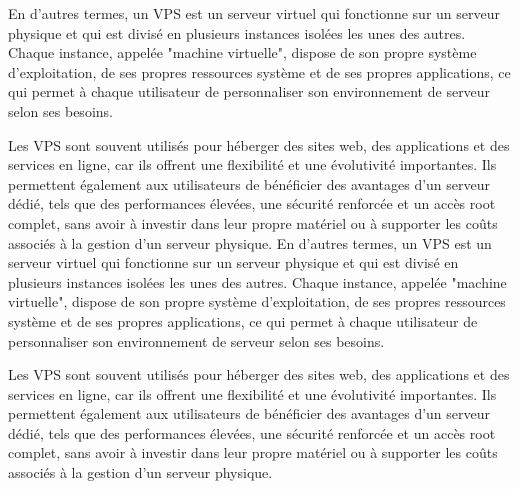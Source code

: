 En d'autres termes, un VPS est un serveur virtuel qui fonctionne sur un serveur physique et qui est divisé en plusieurs instances isolées les unes des autres. Chaque instance, appelée "machine virtuelle", dispose de son propre système d'exploitation, de ses propres ressources système et de ses propres applications, ce qui permet à chaque utilisateur de personnaliser son environnement de serveur selon ses besoins.

Les VPS sont souvent utilisés pour héberger des sites web, des applications et des services en ligne, car ils offrent une flexibilité et une évolutivité importantes. Ils permettent également aux utilisateurs de bénéficier des avantages d'un serveur dédié, tels que des performances élevées, une sécurité renforcée et un accès root complet, sans avoir à investir dans leur propre matériel ou à supporter les coûts associés à la gestion d'un serveur physique.
En d'autres termes, un VPS est un serveur virtuel qui fonctionne sur un serveur physique et qui est divisé en plusieurs instances isolées les unes des autres. Chaque instance, appelée "machine virtuelle", dispose de son propre système d'exploitation, de ses propres ressources système et de ses propres applications, ce qui permet à chaque utilisateur de personnaliser son environnement de serveur selon ses besoins.

Les VPS sont souvent utilisés pour héberger des sites web, des applications et des services en ligne, car ils offrent une flexibilité et une évolutivité importantes. Ils permettent également aux utilisateurs de bénéficier des avantages d'un serveur dédié, tels que des performances élevées, une sécurité renforcée et un accès root complet, sans avoir à investir dans leur propre matériel ou à supporter les coûts associés à la gestion d'un serveur physique.